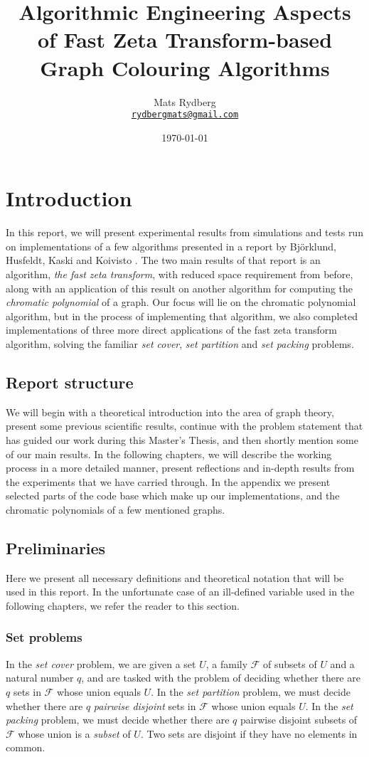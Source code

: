 \documentclass{cslthse-msc}
\title{\huge{Algorithmic Engineering Aspects of Fast Zeta Transform-based Graph Colouring Algorithms}}
\author{Mats Rydberg \\
    {\normalsize \href{mailto:rydbergmats@gmail.com}{\texttt{rydbergmats@gmail.com}}}}
\date{\today}
\begin{document}
\makefrontmatter

\chapter{Introduction}
In this report, we will present experimental results from simulations and tests run on implementations of a few algorithms presented in a report by Björklund, Husfeldt, Kaski and Koivisto \cite{cov_pack}. The two main results of that report is an algorithm, \emph{the fast zeta transform}, with reduced space requirement from before, along with an application of this result on another algorithm for computing the \emph{chromatic polynomial} of a graph. Our focus will lie on the chromatic polynomial algorithm, but in the process of implementing that algorithm, we also completed implementations of three more direct applications of the fast zeta transform algorithm, solving the familiar \emph{set cover}, \emph{set partition} and \emph{set packing} problems.

\section{Report structure}
We will begin with a theoretical introduction into the area of graph theory, present some previous scientific results, continue with the problem statement that has guided our work during this Master's Thesis, and then shortly mention some of our main results. In the following chapters, we will describe the working process in a more detailed manner, present reflections and in-depth results from the experiments that we have carried through. In the appendix we present selected parts of the code base which make up our implementations, and the chromatic polynomials of a few mentioned graphs.

\section{Preliminaries}
Here we present all necessary definitions and theoretical notation that will be used in this report. In the unfortunate case of an ill-defined variable used in the following chapters, we refer the reader to this section.

\subsection{Set problems} \label{setproblems}
In the \emph{set cover} problem, we are given a set $U$, a family $\mathcal{F}$ of subsets of $U$ and a natural number $q$, and are tasked with the problem of deciding whether there are $q$ sets in $\mathcal{F}$ whose union equals $U$. In the \emph{set partition} problem, we must decide whether there are $q$ \emph{pairwise disjoint} sets in $\mathcal{F}$ whose union equals $U$. In the \emph{set packing} problem, we must decide whether there are $q$ pairwise disjoint subsets of $\mathcal{F}$ whose union is a \emph{subset} of $U$. Two sets are disjoint if they have no elements in common.
\end{document}
